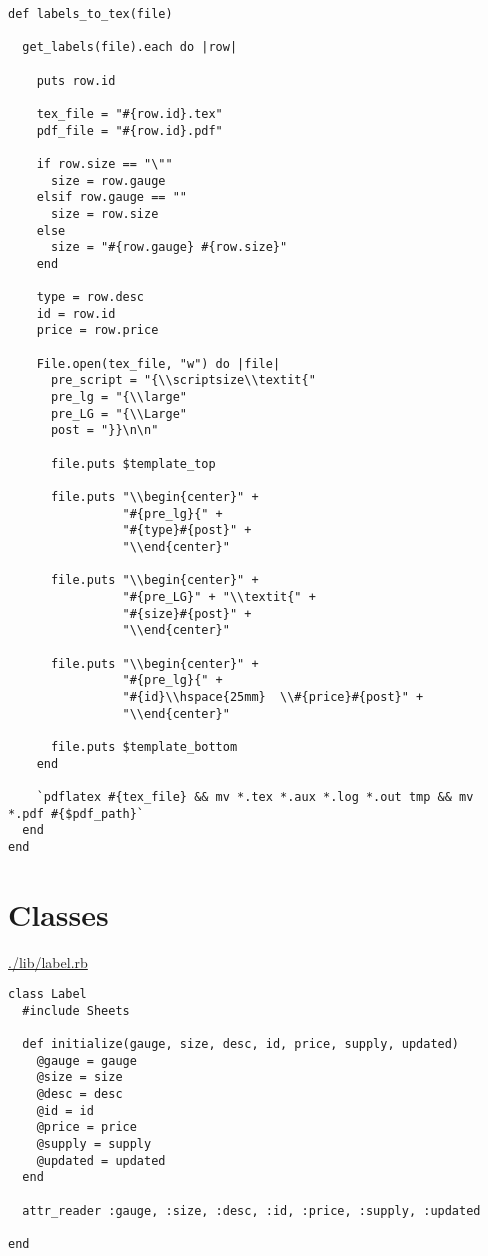 \documentclass[11pt]{article}
\begin{document}
\begin{verbatim}
def labels_to_tex(file)

  get_labels(file).each do |row|

    puts row.id

    tex_file = "#{row.id}.tex"
    pdf_file = "#{row.id}.pdf"

    if row.size == "\""
      size = row.gauge
    elsif row.gauge == ""
      size = row.size
    else
      size = "#{row.gauge} #{row.size}"
    end

    type = row.desc
    id = row.id
    price = row.price

    File.open(tex_file, "w") do |file|
      pre_script = "{\\scriptsize\\textit{"
      pre_lg = "{\\large"
      pre_LG = "{\\Large"
      post = "}}\n\n"

      file.puts $template_top

      file.puts "\\begin{center}" +
                "#{pre_lg}{" +
                "#{type}#{post}" +
                "\\end{center}"

      file.puts "\\begin{center}" +
                "#{pre_LG}" + "\\textit{" +
                "#{size}#{post}" +
                "\\end{center}"

      file.puts "\\begin{center}" +
                "#{pre_lg}{" +
                "#{id}\\hspace{25mm}  \\#{price}#{post}" +
                "\\end{center}"

      file.puts $template_bottom
    end

    `pdflatex #{tex_file} && mv *.tex *.aux *.log *.out tmp && mv *.pdf #{$pdf_path}`
  end
end
\end{verbatim}

\section{Classes}
\label{sec-4}

\url{./lib/label.rb}

\begin{verbatim}
class Label
  #include Sheets

  def initialize(gauge, size, desc, id, price, supply, updated)
    @gauge = gauge
    @size = size
    @desc = desc
    @id = id
    @price = price
    @supply = supply
    @updated = updated
  end

  attr_reader :gauge, :size, :desc, :id, :price, :supply, :updated

end
\end{verbatim}
\end{document}

